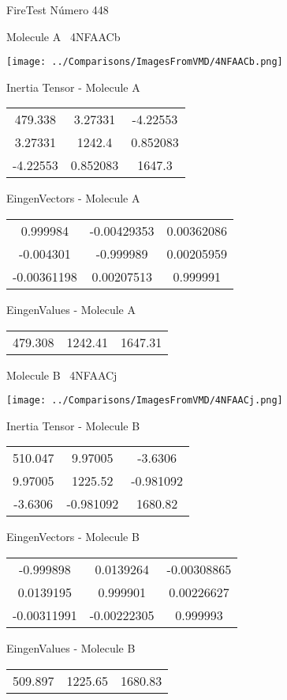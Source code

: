 \vtab[-3cm]
\begin{center}
{\large FireTest \tab Número 448}
\end{center}
\begin{multicols}{2}
\begin{center}

Molecule A \
4NFAACb

\texttt{[image: ../Comparisons/ImagesFromVMD/4NFAACb.png]}

Inertia Tensor - Molecule A \\
\begin{tabular}{|c c c|}
479.338	 & 	3.27331	 & 	-4.22553	 \\
3.27331	 & 	1242.4	 & 	0.852083	 \\
-4.22553	 & 	0.852083	 & 	1647.3
\end{tabular}

\vtab
 EingenVectors - Molecule A     \\
\begin{tabular}{|c c c|}
0.999984	 & 	-0.00429353	 & 	0.00362086	 \\
-0.004301	 & 	-0.999989	 & 	0.00205959	 \\
-0.00361198	 & 	0.00207513	 & 	0.999991
\end{tabular}

\vtab
 EingenValues - Molecule A     \\
\begin{tabular}{|c c c|}
479.308	 & 	1242.41	 & 	1647.31	 \\
\end{tabular}
\columnbreak

Molecule B \
4NFAACj

\texttt{[image: ../Comparisons/ImagesFromVMD/4NFAACj.png]}

Inertia Tensor - Molecule B \\
\begin{tabular}{|c c c|}
510.047	 & 	9.97005	 & 	-3.6306	 \\
9.97005	 & 	1225.52	 & 	-0.981092	 \\
-3.6306	 & 	-0.981092	 & 	1680.82
\end{tabular}

\vtab
 EingenVectors - Molecule B     \\
\begin{tabular}{|c c c|}
-0.999898	 & 	0.0139264	 & 	-0.00308865	 \\
0.0139195	 & 	0.999901	 & 	0.00226627	 \\
-0.00311991	 & 	-0.00222305	 & 	0.999993
\end{tabular}

\vtab
 EingenValues - Molecule B     \\
\begin{tabular}{|c c c|}
509.897	 & 	1225.65	 & 	1680.83	 \\
\end{tabular}

\end{center}
\end{multicols}

